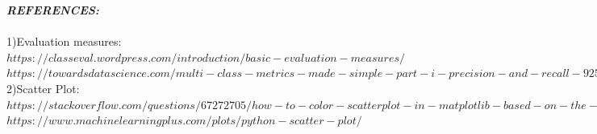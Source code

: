 \documentclass[conference]{IEEEtran}
\begin{document}
\textbf{\textit{REFERENCES:}}\\\\
1)Evaluation measures: $https://classeval.wordpress.com/introduction/basic-evaluation-measures/$ \\
$https://towardsdatascience.com/multi-class-metrics-made-simple-part-i-precision-and-recall-9250280bddc2$ \\
2)Scatter Plot: $https://stackoverflow.com/questions/67272705/how-to-color-scatterplot-in-matplotlib-based-on-the-values-of-y-axis$
\\$https://www.machinelearningplus.com/plots/python-scatter-plot/$
\end{document}
